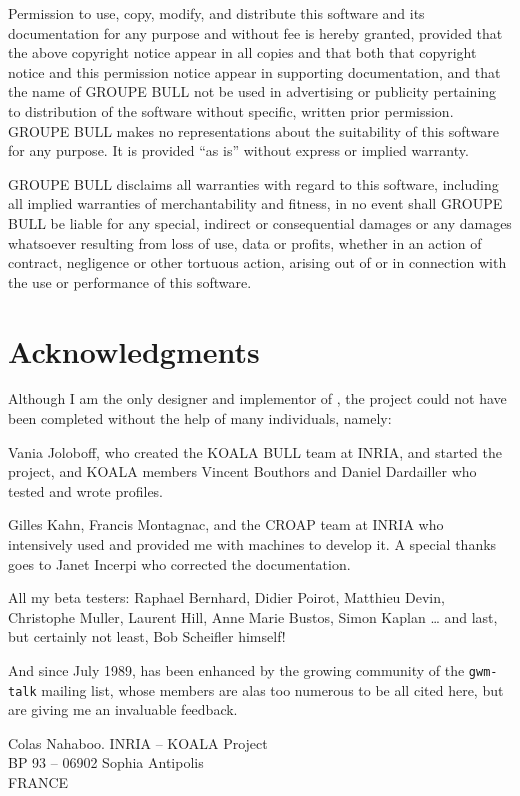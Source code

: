 {\sf
Permission to use, copy, modify, and distribute this software and its
documentation for any purpose and without fee is hereby granted, provided
that the above copyright notice appear in all copies and that both that
copyright notice and this permission notice appear in supporting
documentation, and that the name of GROUPE BULL not be used in advertising
or publicity pertaining to distribution of the software without specific,
written prior permission.  GROUPE BULL makes no representations about the
suitability of this software for any purpose.  It is provided ``as is''
without express or implied warranty.

GROUPE BULL disclaims all warranties with regard to this software,
including all implied warranties of merchantability and fitness,
in no event shall GROUPE BULL be liable for any special,
indirect or consequential damages or any damages
whatsoever resulting from loss of use, data or profits,
whether in an action of contract, negligence or other tortuous
action, arising out of or in connection with the use 
or performance of this software.
}

\section*{Acknowledgments}

Although I am the only designer and implementor of {\GWM}, the project could
not have been completed without the help of many individuals, namely:

Vania Joloboff, who created the KOALA BULL team at INRIA, and started the 
{\GWM} project, and KOALA members Vincent Bouthors and Daniel Dardailler
who tested {\GWM} and wrote {\WOOL} profiles.

Gilles Kahn, Francis Montagnac, and the CROAP team at INRIA who intensively
used {\GWM} and provided me with machines to develop it. A special thanks
goes to Janet Incerpi who corrected the documentation.

All my beta testers: Raphael Bernhard, Didier Poirot, Matthieu Devin,
Christophe Muller, Laurent Hill, Anne Marie Bustos, Simon Kaplan \ldots
and last, but certainly not least, Bob Scheifler himself!

And since July 1989, {\GWM} has been enhanced by the growing community of
the {\tt gwm-talk} mailing list, whose members are alas too numerous to be all 
cited here, but are giving me an invaluable feedback.

\begin{flushright}
{\Large Colas Nahaboo.\quad}
{\small
INRIA -- KOALA Project\\
BP 93 -- 06902 Sophia Antipolis\\
FRANCE\\
}
\end{flushright}

